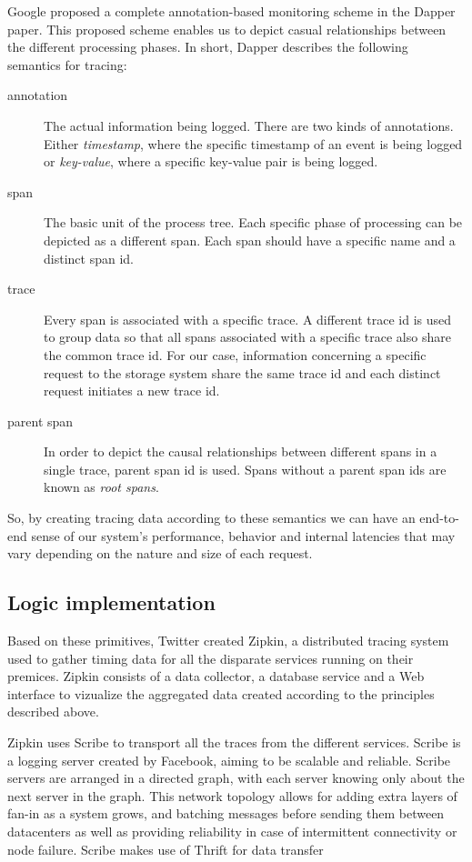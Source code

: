 \documentclass[a4paper,10pt,twocolumn]{article}
\begin{document}
Google proposed a complete annotation-based monitoring scheme in the Dapper 
paper\cite{dapper}. This proposed scheme enables us to depict casual
relationships between the different processing phases. In short, Dapper 
describes the following semantics for tracing:
\begin{description}
\item[annotation]
The actual information being logged. There are two kinds of annotations. Either
\emph{timestamp}, where the specific timestamp of an event is being logged or 
\emph{key-value}, where a specific key-value pair is being logged.
\item[span]
The basic unit of the process tree. Each specific phase of processing can be 
depicted as a different span. Each span should have a specific name and a 
distinct span id.
\item[trace]
Every span is associated with a specific trace. A different trace id is used 
to group data so that all spans associated with a specific trace also share the
common trace id. For our case, information concerning a specific request to the
storage system share the same trace id and each distinct request initiates a new
trace id.
\item[parent span] 
In order to depict the causal relationships between different spans in a single
trace, parent span id is used. Spans without a parent span ids are  known as 
\emph{root spans}.
\end{description}

So, by creating tracing data according to these semantics we can have an
end-to-end sense of our system's performance, behavior and internal latencies
that may vary depending on the nature and size of each request.

\subsection{Logic implementation} Based on these primitives, Twitter created
Zipkin\cite{zipkin}, a distributed tracing system used to gather timing data for
all the disparate services running on their premices. Zipkin consists of a data
collector, a database service and a Web interface to vizualize the aggregated
data created according to the principles described above.

Zipkin uses Scribe\cite{scribe} to transport all the traces from the different
services. Scribe is a logging server created by Facebook, aiming to be scalable
and reliable. Scribe servers are arranged in a directed graph, with each server
knowing only about the next server in the graph. This network topology allows
for adding extra layers of fan-in as a system grows, and batching messages
before sending them between datacenters as well as providing reliability in case
of intermittent connectivity or node failure. Scribe makes use of
Thrift\cite{thift} for data transfer
\end{document}
